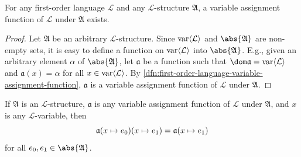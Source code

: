 \begin{thm}
     \label{thm:first-order-language-existence-of-variable-assignment-function}
    For any first-order language \( \mathcal{L} \) and any \( \mathcal{L} \)-structure \( \mathfrak{A} \),
    a variable assignment function of \( \mathcal{L} \) under \( \mathfrak{A} \) exists.
\end{thm}

\begin{proof}
    Let \( \mathfrak{A} \) be an arbitrary \( \mathcal{L} \)-structure.
    Since \( \operatorname{var} \langle\mathcal{L}\rangle \) and \( \abs{\mathfrak{A}} \) are non-empty sets,
    it is easy to define a function on \( \operatorname{var} \langle\mathcal{L}\rangle \) into \( \abs{\mathfrak{A}} \).
    E.g., given an arbitrary element \( \alpha \) of \( \abs{\mathfrak{A}} \),
    let \( \mathfrak{a} \) be a function such that \( \dom \mathfrak{a} = \folvars{\mathcal{L}} \) and \( \mathfrak{a}(x) = \alpha \) for all \( x \in \operatorname{var} \langle\mathcal{L}\rangle \).
    By \cref{dfn:first-order-language-variable-assignment-function}, \( \mathfrak{a} \) is a variable assignment function of \( \mathcal{L} \) under \( \mathfrak{A} \).
\end{proof}

\begin{thm}
     \label{thm:first-order-language-the-last-modification-will-take-effect-if-the-same-variable-symbol-is-modified-for-a-variable-assignment-function}
    If \( \mathfrak{A} \) is an \( \mathcal{L} \)-structure, \( \mathfrak{a} \) is any variable assignment function of \( \mathcal{L} \) under \( \mathfrak{A} \),
    and \( x \) is any \( \mathcal{L} \)-variable, then
    \begin{equation*}
        \folmodifiedvariableassignmentfunction{ \folmodifiedvariableassignmentfunction{\mathfrak{a}}{x}{e_{0}} }{x}{e_{1}}
        = \folmodifiedvariableassignmentfunction{\mathfrak{a}}{x}{e_{1}}
    \end{equation*}
    for all \( e_{0}, e_{1} \in \abs{\mathfrak{A}} \).
\end{thm}

